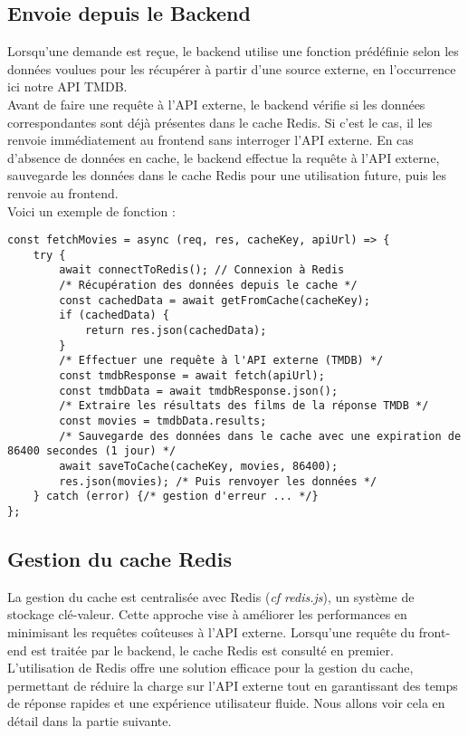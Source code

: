 \documentclass[a4paper]{article}
\begin{document}
\subsection{Envoie depuis le Backend}
Lorsqu'une demande est reçue, le backend utilise une fonction prédéfinie selon les données voulues pour les récupérer à partir d'une source externe, en l'occurrence ici notre API TMDB.\\
Avant de faire une requête à l'API externe, le backend vérifie si les données correspondantes sont déjà présentes dans le cache Redis. Si c'est le cas, il les renvoie immédiatement au frontend sans interroger l'API externe. En cas d'absence de données en cache, le backend effectue la requête à l'API externe, sauvegarde les données dans le cache Redis pour une utilisation future, puis les renvoie au frontend.\\
Voici un exemple de fonction : 
\begin{lstlisting}
const fetchMovies = async (req, res, cacheKey, apiUrl) => {
    try {
        await connectToRedis(); // Connexion à Redis
        /* Récupération des données depuis le cache */
        const cachedData = await getFromCache(cacheKey); 
        if (cachedData) { 
            return res.json(cachedData);
        }
        /* Effectuer une requête à l'API externe (TMDB) */
        const tmdbResponse = await fetch(apiUrl); 
        const tmdbData = await tmdbResponse.json();
        /* Extraire les résultats des films de la réponse TMDB */
        const movies = tmdbData.results;
        /* Sauvegarde des données dans le cache avec une expiration de 86400 secondes (1 jour) */
        await saveToCache(cacheKey, movies, 86400);
        res.json(movies); /* Puis renvoyer les données */
    } catch (error) {/* gestion d'erreur ... */}
};
\end{lstlisting}

\subsection{Gestion du cache Redis}
La gestion du cache est centralisée avec Redis (\textit{cf redis.js}), un système de stockage clé-valeur. Cette approche vise à améliorer les performances en minimisant les requêtes coûteuses à l'API externe. Lorsqu'une requête du front-end est traitée par le backend, le cache Redis est consulté en premier.\\
L'utilisation de Redis offre une solution efficace pour la gestion du cache, permettant de réduire la charge sur l'API externe tout en garantissant des temps de réponse rapides et une expérience utilisateur fluide. Nous allons voir cela en détail dans la partie suivante.\\
\end{document}
